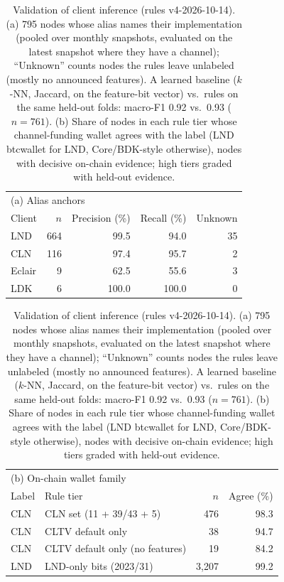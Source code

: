 \begin{table}[t]
\centering
\caption{Validation of client inference (rules v4-2026-10-14). (a) 795 nodes whose
alias names their implementation (pooled over monthly snapshots, evaluated on the latest snapshot where they have a
channel); ``Unknown'' counts nodes the rules leave unlabeled (mostly no announced features). A learned baseline
($k$-NN, Jaccard, on the feature-bit vector) vs.\ rules on the same held-out folds: macro-F1 0.92 vs.\ 0.93 ($n=761$). (b) Share of nodes in each rule tier whose channel-funding wallet agrees with the
label (LND btcwallet for LND, Core/BDK-style otherwise), nodes with decisive on-chain evidence; high tiers graded with
held-out evidence.}
\label{tab:classifier-eval}
\small
\begin{tabular}{lrrrr}
\toprule
\multicolumn{5}{l}{(a) Alias anchors} \\
Client & $n$ & Precision (\%) & Recall (\%) & Unknown \\
\midrule
LND & 664 & 99.5 & 94.0 & 35 \\
CLN & 116 & 97.4 & 95.7 & 2 \\
Eclair & 9 & 62.5 & 55.6 & 3 \\
LDK & 6 & 100.0 & 100.0 & 0 \\
\bottomrule
\end{tabular}

\vspace{4pt}
\begin{tabular}{llrr}
\toprule
\multicolumn{4}{l}{(b) On-chain wallet family} \\
Label & Rule tier & $n$ & Agree (\%) \\
\midrule
CLN & CLN set (11 + 39/43 + 5) & 476 & 98.3 \\
CLN & CLTV default only & 38 & 94.7 \\
CLN & CLTV default only (no features) & 19 & 84.2 \\
LND & LND-only bits (2023/31) & 3,207 & 99.2 \\
\bottomrule
\end{tabular}
\end{table}
